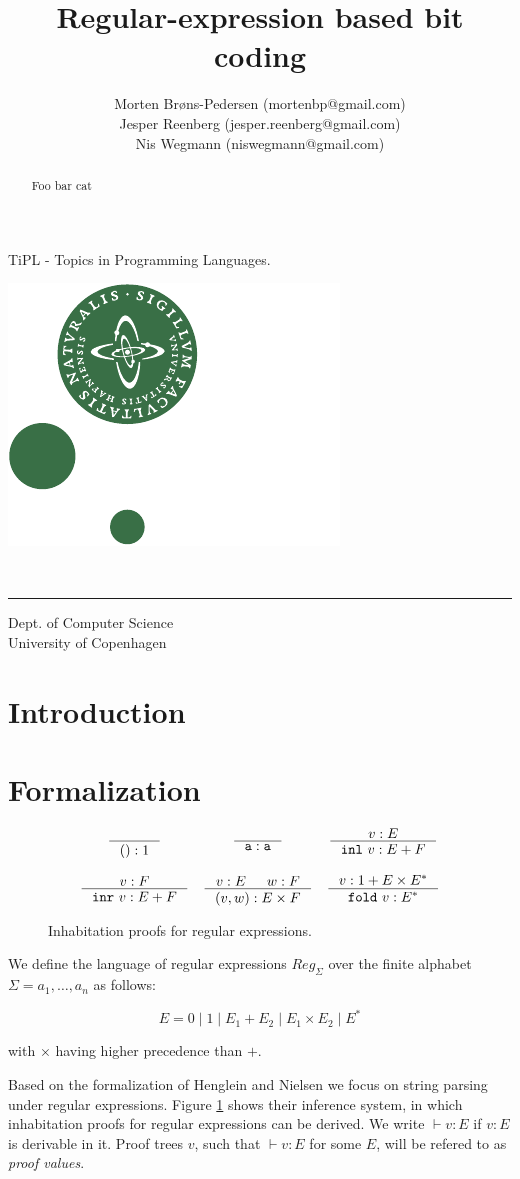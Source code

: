 \documentclass[a4paper, oneside]{memoir}
\title{Regular-expression based bit coding}
\author{Morten Brøns-Pedersen {\footnotesize (mortenbp@gmail.com)}\\
Jesper Reenberg {\footnotesize (jesper.reenberg@gmail.com)} \\
Nis Wegmann {\footnotesize (niswegmann@gmail.com)}}
\makeatletter
\theoremstyle{definition}
\def\maketitle{%
  \null
  \thispagestyle{empty}%
  \vfill
  \begin{center}\leavevmode
    \normalfont
    \Huge{\raggedleft \@title\par}%
    \hrulefill\par
    \Large{\raggedright \subtitle\par}%
    \vskip 2cm
    {\@date\par}%
  \end{center}%
  \vfill
\begin{minipage}{80pt}
\includegraphics*[scale=0.75]{imgs/nat-logo}
\end{minipage}
\begin{minipage}{300pt}
  \begin{flushleft}
    {\large \@author } \\
    {\footnotesize \suplementInfo }

  \end{flushleft}
\end{minipage}
\cleardoublepage %
  \clearpage %
}
\def\subtitle{\footnotesize{TiPL - Topics in Programming Languages.}}
\def\suplementInfo{
  \kern 5pt \hrule width 11pc \kern 5pt %
  Dept. of Computer Science \\
  University of Copenhagen}
\makeatother
\begin{document}
\frontmatter

\maketitle
\thispagestyle{empty}


\begin{abstract}
Foo bar cat
\end{abstract}

\clearpage 

\tableofcontents*

\mainmatter

\section{Introduction}

\newpage

\section{Formalization}

\begin{figure}
\[
\begin{array}{ccc}
  \inference{}{() : 1}
&
  \inference{}{\texttt{a} : \texttt{a}}
&
  \inference{v : E}{\mathtt{inl}\ v : E + F}
\\
\\
  \inference{v : F}{\mathtt{inr}\ v : E + F}
&
  \inference{v : E & w : F}{(v, w) : E \times F}
&
  \inference{v : 1 + E \times E^{\ast}}{\mathtt{fold}\ v : E^{\ast}}
\end{array}
\]
\caption{Inhabitation proofs for regular expressions.}
\label{fig:inhabitation_proofs}
\end{figure}

We define the language of regular expressions $Reg_\Sigma$ over the finite alphabet $\Sigma = {a_1, \dots, a_n}$ as follows:

\[
    E = 0 \; | \; 1 \; | \; E_1 + E_2 \; | \; E_1 \times E_2 \; | \; E^{*}
\]

\noindent with $\times$ having higher precedence than $+$.

Based on the formalization of Henglein and Nielsen \cite{heni2010} we focus on string parsing under regular expressions. Figure \ref{fig:inhabitation_proofs} shows their inference system, in which inhabitation proofs for regular expressions can be derived. We write $\vdash v : E$ if $v : E$ is derivable in it. Proof trees $v$, such that $\vdash v : E$ for some $E$, will be refered to as \emph{proof values}.
\end{document}
